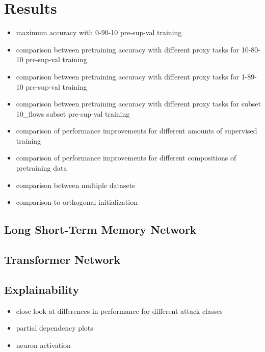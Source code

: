 \chapter{Results} \label{sec:results}

\begin{itemize}
	\item maximum accuracy with 0-90-10 pre-sup-val training
	\item comparison between pretraining accuracy with different proxy tasks for 10-80-10 pre-sup-val training
	\item comparison between pretraining accuracy with different proxy tasks for 1-89-10 pre-sup-val training
	\item comparison between pretraining accuracy with different proxy tasks for subset 10\_flows subset pre-sup-val training
	\item comparison of performance improvements for different amounts of supervised training
	\item comparison of performance improvements for different compositions of pretraining data
	\item comparison between multiple datasets
	\item comparison to orthogonal initialization
\end{itemize}

\section{Long Short-Term Memory Network}

\section{Transformer Network}

\section{Explainability}

\begin{itemize}
	\item close look at differences in performance for different attack classes
	\item partial dependency plots
	\item neuron activation
\end{itemize}

\newpage
